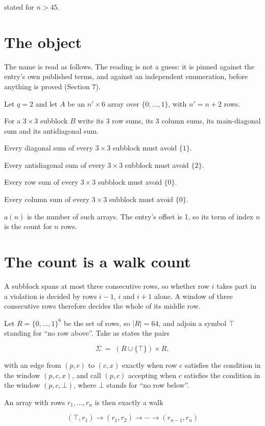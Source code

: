 \documentclass[11pt]{article}
\theoremstyle{definition}
\begin{document}
stated for $n > 45$.

\section{The object}

The name is read as follows. The reading is not a guess: it is pinned against the entry's own published terms, and against an independent enumeration, before anything is proved (Section 7).

Let $q = 2$ and let $A$ be an $n' \times 6$ array over $\{0,\dots,1\}$, with $n' = n + 2$ rows.

For a $3\times3$ subblock $B$ write its 3 row sums, its 3 column sums, its main-diagonal sum and its antidiagonal sum.

Every diagonal sum of every $3\times3$ subblock must avoid $\{1\}$.

Every antidiagonal sum of every $3\times3$ subblock must avoid $\{2\}$.

Every row sum of every $3\times3$ subblock must avoid $\{0\}$.

Every column sum of every $3\times3$ subblock must avoid $\{0\}$.

$a(n)$ is the number of such arrays. The entry's offset is 1, so its term of index $n$ is the count for $n$ rows.

\section{The count is a walk count}

A subblock spans at most three consecutive rows, so whether row $i$ takes part in a violation is decided by rows $i-1$, $i$ and $i+1$ alone. A window of three consecutive rows therefore decides the whole of its middle row.

Let $R = \{0,\dots,1\}^{6}$ be the set of rows, so $|R| = 64$, and adjoin a symbol $\top$ standing for ``no row above''. Take as states the pairs

\[\Sigma \;=\; (R \cup \{\top\}) \times R,\]

with an edge from $(p,c)$ to $(c,x)$ exactly when row $c$ satisfies the condition in the window $(p,c,x)$, and call $(p,c)$ accepting when $c$ satisfies the condition in the window $(p,c,\bot)$, where $\bot$ stands for ``no row below''.

An array with rows $r_1,\dots,r_n$ is then exactly a walk

\[(\top,r_1) \to (r_1,r_2) \to \cdots \to (r_{n-1},r_n)\]
\end{document}
